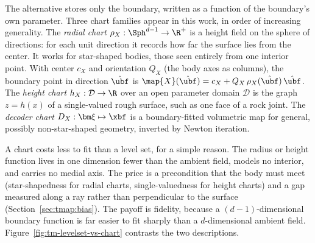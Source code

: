 The alternative stores only the boundary, written as a function of the boundary's own parameter. Three
chart families appear in this work, in order of increasing generality. The \emph{radial chart}
$\rho_X:\Sph^{d-1}\to\R^+$ is a height field on the sphere of directions: for each unit direction it
records how far the surface lies from the center. It works for star-shaped bodies, those seen entirely
from one interior point. With center $c_X$ and orientation $Q_X$ (the body axes as columns), the boundary
point in direction $\hat\ubf$ is $\map{X}(\hat\ubf)=c_X+Q_X\,\rho_X(\hat\ubf)\,\hat\ubf$. The \emph{height
chart} $h_X:\mathcal D\to\R$ over an open parameter domain $\mathcal D$ is the graph $z=h(x)$ of a
single-valued rough surface, such as one face of a rock joint. The \emph{decoder chart}
$D_X:\bm\xi\mapsto\xbf$ is a boundary-fitted volumetric map for general, possibly non-star-shaped geometry,
inverted by Newton iteration.

A chart costs less to fit than a level set, for a simple reason. The radius or
height function lives in one dimension fewer than the ambient field, models no interior, and carries no
medial axis. The price is a precondition that the body must meet (star-shapedness for radial charts,
single-valuedness for height charts) and a gap measured along a ray rather than perpendicular to the
surface (Section~\ref{sec:tmap:bias}). The payoff is fidelity, because a $(d{-}1)$-dimensional boundary
function is far easier to fit sharply than a $d$-dimensional ambient field.
Figure~\ref{fig:tm-levelset-vs-chart} contrasts the two descriptions.


